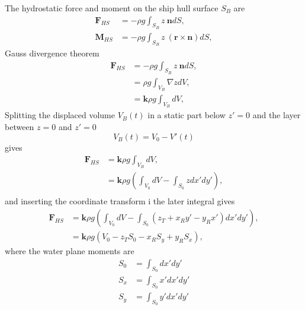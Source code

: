 \documentclass[]{book}
\newcommand{\V}[1]{\boldsymbol{#1}}
\begin{document}
The hydrostatic force and moment on the ship hull surface $S_B$ are
\begin{align}
\V{F}_{HS} &=- \rho g \int_{S_B}  z ~\V{n} dS,  \\
\V{M}_{HS} &=- \rho g \int_{S_B}  z ~ (\V{r} \times \V{n}) dS,
\end{align}
Gauss divergence theorem
\begin{align}
\V{F}_{HS} 	&=- \rho g \int_{S_B}  z ~\V{n} dS,  \\
			&= \rho g \int_{V_B} \nabla z  dV,  \\
			&= \V{k} \rho g \int_{V_B} dV,  
\end{align}
Splitting the displaced volume $V_B(t)$ in a static part below $z'=0$ and the layer between $z=0$ and $z'=0$
\begin{equation}
	V_B(t) = V_0 - V'(t)
\end{equation}
gives 
\begin{align}
\V{F}_{HS} 	&= \V{k} \rho g \int_{V_B} dV,  \\
			&= \V{k} \rho g\left( \int_{V_0} dV - \int_{S_0}  z  dx'dy' \right),  \\
\end{align}
and inserting the coordinate transform i the later integral gives
\begin{align}
\V{F}_{HS}&= \V{k} \rho g\left( \int_{V_0} dV - \int_{S_0}  (z_T + x_R y' - y_R x')  dx'dy' \right),  \\
&= \V{k} \rho g\left( V_0
- z_T S_0   
- x_R S_y 
+ y_R S_x\right),  
\end{align}
where the water plane moments are
\begin{align}
S_0&=\int_{S_0} dx'dy'   \\
S_x&=\int_{S_0}   x'  dx'dy' \\
S_y&=\int_{S_0}   y'  dx'dy' 
\end{align}
\end{document}
